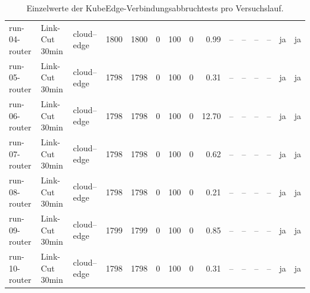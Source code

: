 \begin{table}
{\begin{tabular}{l l p{3.2cm} r r r r r r r r r r r r}
run-04-router & Link-Cut 30min & cloud--edge & 1800 & 1800 & 0 & 100 & 0 & 0.99 & -- & -- & -- & -- & ja & ja \\
run-05-router & Link-Cut 30min & cloud--edge & 1798 & 1798 & 0 & 100 & 0 & 0.31 & -- & -- & -- & -- & ja & ja \\
run-06-router & Link-Cut 30min & cloud--edge & 1798 & 1798 & 0 & 100 & 0 & 12.70 & -- & -- & -- & -- & ja & ja \\
run-07-router & Link-Cut 30min & cloud--edge & 1798 & 1798 & 0 & 100 & 0 & 0.62 & -- & -- & -- & -- & ja & ja \\
run-08-router & Link-Cut 30min & cloud--edge & 1798 & 1798 & 0 & 100 & 0 & 0.21 & -- & -- & -- & -- & ja & ja \\
run-09-router & Link-Cut 30min & cloud--edge & 1799 & 1799 & 0 & 100 & 0 & 0.85 & -- & -- & -- & -- & ja & ja \\
run-10-router & Link-Cut 30min & cloud--edge & 1798 & 1798 & 0 & 100 & 0 & 0.31 & -- & -- & -- & -- & ja & ja \\
\bottomrule
\end{tabular}%
}
\caption{Einzelwerte der KubeEdge-Verbindungsabbruchtests pro Versuchslauf.}
\label{tab:appendix-kubeedge-link-cut-runs}
\end{table}
